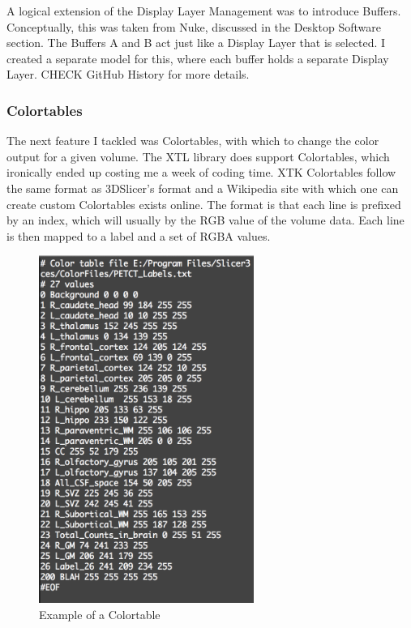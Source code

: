 \documentclass[a4paper,11pt,titlepage]{article}
\begin{document}
A logical extension of the Display Layer Management was to introduce Buffers. Conceptually, this was taken from Nuke, discussed in the Desktop Software section. The Buffers A and B act just like a Display Layer that is selected. I created a separate model for this, where each buffer holds a separate Display Layer. 
CHECK GitHub History for more details.

\subsubsection{Colortables}

The next feature I tackled was Colortables, with which to change the color output for a given volume. The XTL library does support Colortables, which ironically ended up costing me a week of coding time. XTK Colortables follow the same format as 3DSlicer's format and a Wikipedia site with which one can create custom Colortables exists online. The format is that each line is prefixed by an index, which will usually by the RGB value of the volume data. Each line is then mapped to a label and a set of RGBA values.

\begin{figure}[ht!]
\centering
\includegraphics[width=70mm]{graphics/Colortable_01.png}
\caption{Example of a Colortable}
\label{fig:UIdesign1}
\end{figure}
\end{document}
